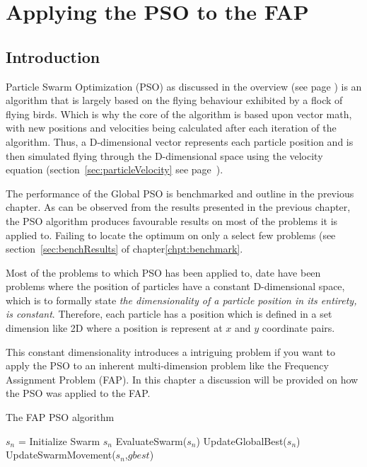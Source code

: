 \chapter{Applying the PSO to the FAP}
\label{chpt:psoapplicationFAP}
\section{Introduction}
Particle Swarm Optimization (PSO) as discussed in the overview (see page \pageref{sec:PSO}) is an algorithm that is largely based on the flying behaviour exhibited by a flock of flying birds. Which is why the core of the algorithm is based upon vector math, with new positions and velocities being calculated after each iteration of the algorithm. Thus, a D-dimensional vector represents each particle position and is then simulated flying through the D-dimensional space using the velocity equation (section~\ref{sec:particleVelocity} see page~\pageref{eq:velocityupdate}).

The performance of the Global PSO is benchmarked and outline in the previous chapter. As can be observed from the results presented in the previous chapter, the PSO algorithm produces favourable results on most of the problems it is applied to. Failing to locate the optimum on only a select few problems (see section~\ref{sec:benchResults} of chapter\ref{chpt:benchmark}. 

Most of the problems to which PSO has been applied to, date have been problems where the position of particles have a constant D-dimensional space, which is to formally state \emph{the dimensionality of a particle position in its entirety, is constant}. Therefore, each particle has a position which is defined in a set dimension like 2D where a position is represent at $x$ and $y$ coordinate pairs.

This constant dimensionality introduces a intriguing problem if you want to apply the PSO to an inherent multi-dimension problem like the Frequency Assignment Problem (FAP). In this chapter a discussion will be provided on how the PSO was applied to the FAP.

\begin{algorithm}
\label{alg:FAPPSO}
\caption{The FAP PSO algorithm}
\begin{algorithmic}
\STATE $s_n$ = Initialize Swarm $s_n$
	\STATE EvaluateSwarm($s_n$)
	\STATE UpdateGlobalBest($s_n$)
	\STATE UpdateSwarmMovement($s_n$,$gbest$)
\ENDWHILE
\end{algorithmic}
\end{algorithm}

